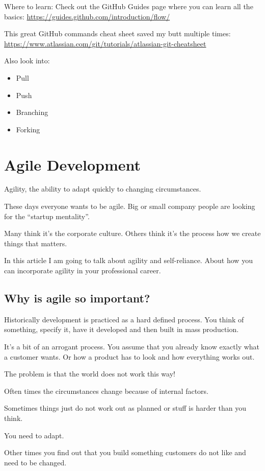 \documentclass[12pt, numbers=noenddot]{scrreprt} %
\begin{document}
Where to learn:
Check out the GitHub Guides page where you can learn all the basics: \url{https://guides.github.com/introduction/flow/}

This great GitHub commands cheat sheet saved my butt multiple times: \url{https://www.atlassian.com/git/tutorials/atlassian-git-cheatsheet}

Also look into:
\begin{itemize}
\item Pull
\item Push
\item Branching
\item Forking
\end{itemize}


\chapter{Agile Development}
Agility, the ability to adapt quickly to changing circumstances.

These days everyone wants to be agile. Big or small company people are looking for the “startup mentality”.

Many think it’s the corporate culture. Others think it’s the process how we create things that matters.

In this article I am going to talk about agility and self-reliance. About how you can incorporate agility in your professional career.

\section{Why is agile so important?}
Historically development is practiced as a hard defined process. You think of something, specify it, have it developed and then built in mass production.

It’s a bit of an arrogant process. You assume that you already know exactly what a customer wants. Or how a product has to look and how everything works out.

The problem is that the world does not work this way!

Often times the circumstances change because of internal factors.

Sometimes things just do not work out as planned or stuff is harder than you think.

You need to adapt.

Other times you find out that you build something customers do not like and need to be changed.
\end{document}
